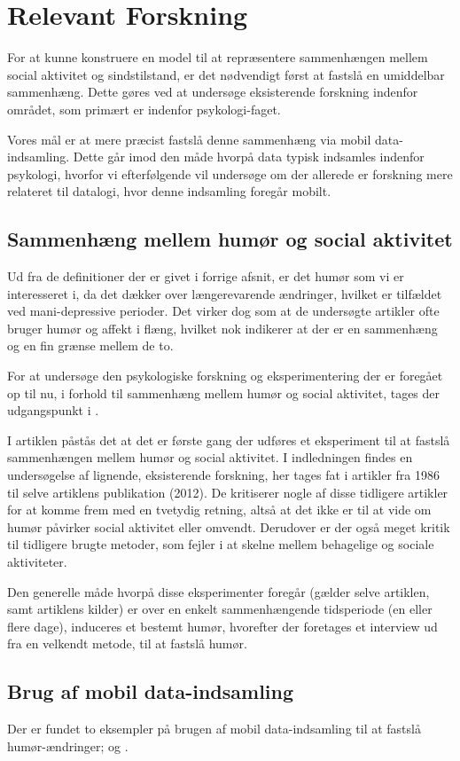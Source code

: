 
\section{Relevant Forskning}
For at kunne konstruere en model til at repræsentere sammenhængen mellem social aktivitet og sindstilstand, er det nødvendigt først at fastslå en umiddelbar sammenhæng.
Dette gøres ved at undersøge eksisterende forskning indenfor området, som primært er indenfor psykologi-faget.

Vores mål er at mere præcist fastslå denne sammenhæng via mobil data-indsamling.
Dette går imod den måde hvorpå data typisk indsamles indenfor psykologi, hvorfor vi efterfølgende vil undersøge om der allerede er forskning mere relateret til datalogi, hvor denne indsamling foregår mobilt.

\subsection{Sammenhæng mellem humør og social aktivitet}
Ud fra de definitioner der er givet i forrige afsnit, er det humør som vi er interesseret i, da det dækker over længerevarende ændringer, hvilket er tilfældet ved mani-depressive perioder.
Det virker dog som at de undersøgte artikler ofte bruger humør og affekt i flæng, hvilket nok indikerer at der er en sammenhæng og en fin grænse mellem de to.

For at undersøge den psykologiske forskning og eksperimentering der er foregået op til nu, i forhold til sammenhæng mellem humør og social aktivitet, tages der udgangspunkt i \citet{whelan}.

I artiklen påstås det at det er første gang der udføres et eksperiment til at fastslå sammenhængen mellem humør og social aktivitet.
I indledningen findes en undersøgelse af lignende, eksisterende forskning, her tages fat i artikler fra 1986 til selve artiklens publikation (2012).
De kritiserer nogle af disse tidligere artikler for at komme frem med en tvetydig retning, altså at det ikke er til at vide om humør påvirker social aktivitet eller omvendt.
Derudover er der også meget kritik til tidligere brugte metoder, som fejler i at skelne mellem behagelige og sociale aktiviteter.

Den generelle måde hvorpå disse eksperimenter foregår (gælder selve artiklen, samt artiklens kilder) er over en enkelt sammenhængende tidsperiode (en eller flere dage), induceres et bestemt humør, hvorefter der foretages et interview ud fra en velkendt metode, til at fastslå humør.


\subsection{Brug af mobil data-indsamling}
Der er fundet to eksempler på brugen af mobil data-indsamling til at fastslå humør-ændringer; \citet{social_sensing} og \citet{social_sensing_2}.
